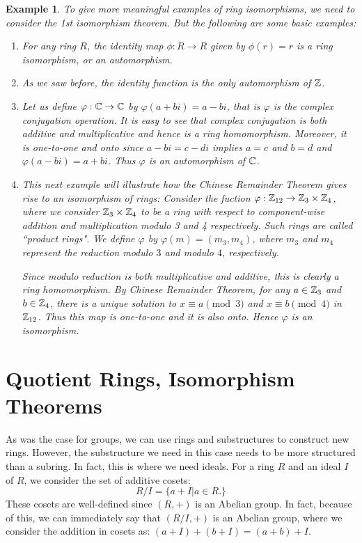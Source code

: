 \documentclass[12pt]{article}
\theoremstyle{plain}
\newtheorem{example}{Example}
\theoremstyle{definition}
\theoremstyle{remark}
\begin{document}
\begin{example} To give more meaningful examples of ring isomorphisms, we need to consider the 1st isomorphism theorem. But the following are some basic examples:
\begin{enumerate}
    \item For any ring $R$, the identity map $\phi:R\rightarrow R$ given by $\phi(r)=r$ is a ring isomorphism, or an automorphism.
    \item As we saw before, the identity function is the only automorphism of $\mathbb{Z}$. 
    \item Let us define $\varphi:\mathbb{C} \rightarrow \mathbb{C}$ by $\varphi(a+bi)=a-bi$, that is $\varphi$ is the complex conjugation operation. It is easy to see that complex conjugation is both additive and multiplicative and hence is a ring homomorphism. Moreover, it is one-to-one and onto since $a-bi=c-di$ implies $a=c$ and $b=d$ and $\varphi(a-bi)=a+bi$. Thus $\varphi$ is an automorphism of $\mathbb{C}$. 
    \item This next example will illustrate how the Chinese Remainder Theorem gives rise to an isomorphism of rings:
    Consider the fuction $\varphi:\mathbb{Z}_{12}\rightarrow \mathbb{Z}_{3}\times \mathbb{Z}_{4}$, where we consider $\mathbb{Z}_3\times \mathbb{Z}_4$ to be a ring with respect to component-wise addition and multiplication modulo 3 and 4 respectively. Such rings are called ``product rings".
    We define $\varphi$ by $\varphi(m) = (m_3, m_4)$, where $m_3$ and $m_4$ represent the reduction modulo $3$ and modulo $4$, respectively. 

    Since modulo reduction is both multiplicative and additive, this is clearly a ring homomorphism. By Chinese Remainder Theorem, for any $a \in \mathbb{Z}_3$ and $b\in \mathbb{Z}_4$, there is a unique solution to  $x\equiv a \pmod{3}$ and $x\equiv b\pmod{4}$ in $\mathbb{Z}_{12}$. Thus this map is one-to-one and it is also onto. Hence $\varphi$ is an isomorphism.  
 \end{enumerate}
\end{example} 

\section{Quotient Rings, Isomorphism Theorems}
As was the case for groups, we can use rings and substructures to construct new rings. However, the substructure we need in this case needs to be more structured than a subring. In fact, this is where we need ideals. For a ring $R$ and an ideal $I$ of $R$, we consider the set of additive cosets:
$$R/I = \{a+I|a\in R.\}$$
These cosets are well-defined since $(R,+)$ is an Abelian group. In fact, because of this, we can immediately say that $(R/I,+)$ is an Abelian group, where we consider the addition in cosets as: $(a+I)+(b+I) = (a+b)+I$. 
\end{document}
